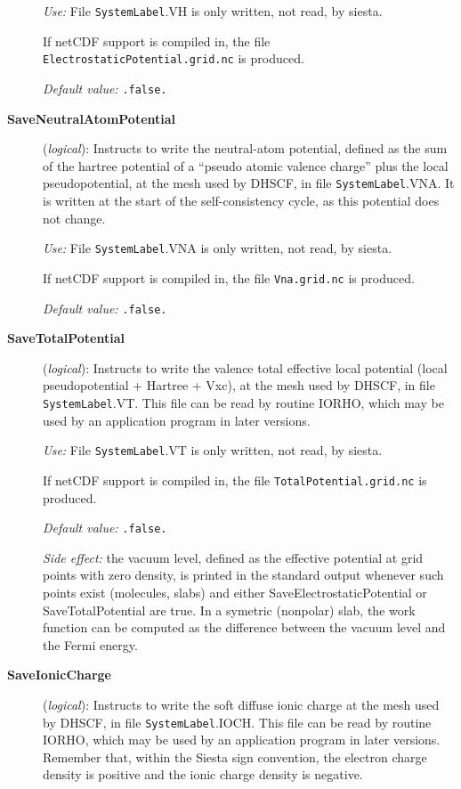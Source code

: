 \documentclass[11pt]{article}
\begin{document}
\begin{description}
{\it Use:} File {\tt SystemLabel}.VH is only written, not read, by siesta.

If netCDF support is compiled in, the file {\tt
ElectrostaticPotential.grid.nc} is produced.

{\it Default value:} {\tt .false.}

\item[{\bf SaveNeutralAtomPotential}] ({\it logical}):
Instructs to write the neutral-atom potential, defined as the
sum of the hartree potential of a ``pseudo atomic valence charge''
plus the local pseudopotential, at the mesh used by DHSCF,
in file {\tt SystemLabel}.VNA. It is written at the start of the
self-consistency cycle, as this potential does not change.

{\it Use:} File {\tt SystemLabel}.VNA is only written, not read, by siesta.

If netCDF support is compiled in, the file {\tt Vna.grid.nc} is produced.

{\it Default value:} {\tt .false.}


\item[{\bf SaveTotalPotential}] ({\it logical}):
Instructs to write the valence total effective local potential
(local pseudopotential + Hartree + Vxc), at the
mesh used by DHSCF,
in file {\tt SystemLabel}.VT. This file can be read by routine IORHO,
which may be used by an application program in later versions.

{\it Use:} File {\tt SystemLabel}.VT is only written, not read, by siesta.

If netCDF support is compiled in, the file {\tt TotalPotential.grid.nc} is produced.

{\it Default value:} {\tt .false.}

{\it Side effect:} the vacuum level, defined as the effective 
potential at grid points with zero density, is printed in the standard 
output whenever such points exist (molecules, slabs) and either 
SaveElectrostaticPotential or SaveTotalPotential are true.
In a symetric (nonpolar) slab, the work function can be computed as 
the difference between the vacuum level and the Fermi energy.


\item[{\bf SaveIonicCharge}] ({\it logical}):
Instructs to write the soft diffuse ionic charge at the
mesh used by DHSCF,
in file {\tt SystemLabel}.IOCH. This file can be read by routine IORHO,
which may be used by an application program in later versions.
Remember that, within the {\sc Siesta} sign convention, the electron charge
density is positive and the ionic charge density is negative.



\end{description}
\end{document}
